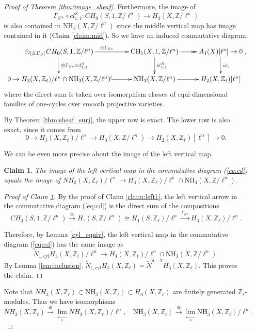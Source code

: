 \documentclass{amsart}
\newtheorem{claim}[theorem]{Claim}
\theoremstyle{definition}
\theoremstyle{remark}
\newcommand{\mbb}{\mathbb}
\newcommand{\ZZ}{\mbb{Z}}
\newcommand{\cyl}{\text{cyl}}
\begin{document}
\begin{proof}[Proof of Theorem {\ref{thm:image_sheaf}}]
Furthermore, the image of
\[
\Gamma_{S*}\circ cl^S_{1, 1}: CH_0(S, 1, \ZZ/\ell^n) \to H_3(X, \ZZ/\ell^n)
\]
is also contained in $\text{NH}_3(X, \ZZ/\ell^n)$ since the middle vertical map has image contained in it (Claim \ref{claim:mid}).
So we have an induced commutative diagram:
\begin{equation}\label{eq:cd}
\xymatrix{
\oplus_{(S, \Gamma_S)} CH_0(S,1, \ZZ/\ell^n)\ar[r]^{\oplus \Gamma_{S*}}\ar[d]^{\oplus \Gamma_{S*}\circ cl_{1, 1}^S} &\text{CH}_1(X, 1, \ZZ/\ell^n) \ar@{->>}[r]\ar[d]^{cl_{1, 1}^X} &A_1(X)[\ell^n] \ar[d]^{cl_{1}} \to 0\\
  0 \to H_3(X, \ZZ_\ell)/\ell^n \cap \text{NH}_3(X, \ZZ/\ell^n) \ar@{^{(}->}[r] & \text{NH}_3(X, \ZZ/\ell^n) \ar[r] & H_2(X, \ZZ_\ell)[\ell^n]},
\end{equation}
where the direct sum is taken over isomorphism classes of equi-dimensional families of one-cycles over smooth projective varieties. 

By Theorem \ref{thm:sheaf_surj}, the upper row is exact. The lower row is also exact, since it comes from
\[
0 \to H_3(X, \ZZ_\ell)/\ell^n \to H_3(X, \ZZ/\ell^n) \to H_2(X, \ZZ_\ell)[\ell^n] \to 0.
\]

We can be even more precise about the image of the left vertical map.
\begin{claim}\label{claim:left}
    The image of the left vertical map in the commutative diagram (\ref{eq:cd}) equals the image of $\tilde{N}H_3(X, \ZZ_\ell)/\ell^n \to H_3(X, \ZZ_\ell)/\ell^n \cap \text{NH}_3(X, \ZZ/\ell^n)$.
\end{claim}
\begin{proof}[Proof of Claim \ref{claim:left}]
   By the proof of Claim \ref{claim:left1}, the left vertical arrow in the commutative diagram (\ref{eq:cd}) is the direct sum of the  compositions
\[
CH_0(S, 1, \ZZ/\ell^n) \xrightarrow{\cong} H_1(S, \ZZ/\ell^n)\cong H_1(S, \ZZ_\ell)/\ell^n \xrightarrow{\Gamma_{S*}} H_3(X, \ZZ_\ell)/\ell^n.\]


Therefore, by Lemma \ref{cyl_equiv}, the left vertical map in the commutative diagram (\ref{eq:cd}) has the same image as $$\tilde{N}_{1, \cyl}H_3(X, \ZZ_\ell)/\ell^n \to H_3(X, \ZZ_\ell)/\ell^n \cap \text{NH}_3(X, \ZZ/\ell^n).$$
 By Lemma \ref{lem:inclusion}, $\tilde{N}_{1, \cyl}H_3(X, \ZZ_\ell)=\tilde{N}^{d-2}H_3(X, \ZZ_\ell)$. This proves the claim.
\end{proof}

Note that $\tilde{N}H_3(X, \ZZ_\ell)\subset \text{NH}_3(X, \ZZ_\ell)\subset H_3(X, \ZZ_\ell)$ are finitely generated $\ZZ_\ell$-modules. Thus we have isomorphisms 
\[
\tilde{N}H_3(X, \ZZ_\ell) \xrightarrow{\cong}\lim \limits_{\xleftarrow[n]{}} \tilde{N}H_3(X, \ZZ_\ell)/\ell^n,\quad
 \text{NH}_3(X, \ZZ_\ell) \xrightarrow{\cong}
\lim \limits_{\xleftarrow[n]{}} \text{NH}_3(X, \ZZ_\ell)/\ell^n.
\]


\end{proof}
\end{document}
